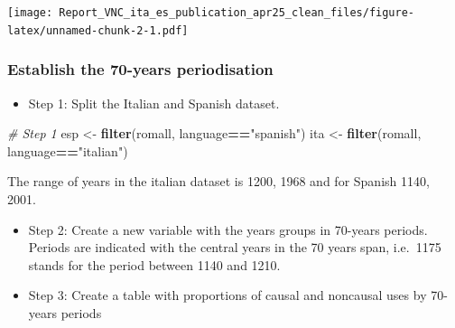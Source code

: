 \documentclass[
]{article}
\newenvironment{Shaded}{\begin{snugshade}}{\end{snugshade}}
\newcommand{\CommentTok}[1]{\textcolor[rgb]{0.56,0.35,0.01}{\textit{#1}}}
\newcommand{\FunctionTok}[1]{\textcolor[rgb]{0.13,0.29,0.53}{\textbf{#1}}}
\newcommand{\NormalTok}[1]{#1}
\newcommand{\OtherTok}[1]{\textcolor[rgb]{0.56,0.35,0.01}{#1}}
\newcommand{\SpecialCharTok}[1]{\textcolor[rgb]{0.81,0.36,0.00}{\textbf{#1}}}
\newcommand{\StringTok}[1]{\textcolor[rgb]{0.31,0.60,0.02}{#1}}
\providecommand{\tightlist}{%
  \setlength{\itemsep}{0pt}\setlength{\parskip}{0pt}}
\begin{document}
\texttt{[image: Report\_VNC\_ita\_es\_publication\_apr25\_clean\_files/figure-latex/unnamed-chunk-2-1.pdf]}

\subsubsection{Establish the 70-years
periodisation}\label{establish-the-70-years-periodisation}

\begin{itemize}
\tightlist
\item
  Step 1: Split the Italian and Spanish dataset.
\end{itemize}

\begin{Shaded}
\begin{Highlighting}[]
\CommentTok{\# Step 1}
\NormalTok{esp }\OtherTok{\textless{}{-}} \FunctionTok{filter}\NormalTok{(romall, language}\SpecialCharTok{==}\StringTok{"spanish"}\NormalTok{)}
\NormalTok{ita }\OtherTok{\textless{}{-}} \FunctionTok{filter}\NormalTok{(romall, language}\SpecialCharTok{==}\StringTok{"italian"}\NormalTok{)}
\end{Highlighting}
\end{Shaded}

The range of years in the italian dataset is 1200, 1968 and for Spanish
1140, 2001.

\begin{itemize}
\tightlist
\item
  Step 2: Create a new variable with the years groups in 70-years
  periods. Periods are indicated with the central years in the 70 years
  span, i.e.~1175 stands for the period between 1140 and 1210.
\item
  Step 3: Create a table with proportions of causal and noncausal uses
  by 70-years periods
\end{itemize}
\end{document}
